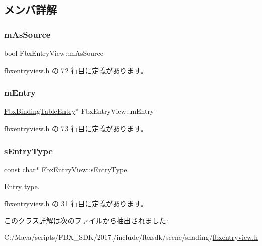 \subsection{メンバ詳解}
\mbox{\label{class_fbx_entry_view_a274da88dfb87f2725f9c8fdbfe860c75}} 
\subsubsection{\texorpdfstring{m\+As\+Source}{mAsSource}}
{\footnotesize\ttfamily bool Fbx\+Entry\+View\+::m\+As\+Source\hspace{0.3cm}{\ttfamily [protected]}}



 fbxentryview.\+h の 72 行目に定義があります。

\mbox{\label{class_fbx_entry_view_a74afe18ad35e48e7bd6dce480ab49ad7}} 
\subsubsection{\texorpdfstring{m\+Entry}{mEntry}}
{\footnotesize\ttfamily \hyperlink{class_fbx_binding_table_entry}{Fbx\+Binding\+Table\+Entry}$\ast$ Fbx\+Entry\+View\+::m\+Entry\hspace{0.3cm}{\ttfamily [protected]}}



 fbxentryview.\+h の 73 行目に定義があります。

\mbox{\label{class_fbx_entry_view_a483b58dc47c39143426afe0d2076b6f6}} 
\subsubsection{\texorpdfstring{s\+Entry\+Type}{sEntryType}}
{\footnotesize\ttfamily const char$\ast$ Fbx\+Entry\+View\+::s\+Entry\+Type\hspace{0.3cm}{\ttfamily [static]}}



Entry type. 



 fbxentryview.\+h の 31 行目に定義があります。



このクラス詳解は次のファイルから抽出されました\+:\begin{DoxyCompactItemize}
\item 
C\+:/\+Maya/scripts/\+F\+B\+X\+\_\+\+S\+D\+K/2017./include/fbxsdk/scene/shading/\hyperlink{fbxentryview_8h}{fbxentryview.\+h}\end{DoxyCompactItemize}
